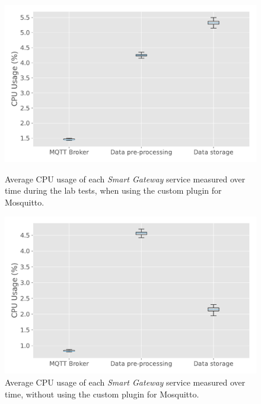 \begin{figure}[H]
    \begin{minipage}{0.45\linewidth}
        \centering
        \includegraphics[width=\linewidth]{images/labtest_cpu_usage_with_plugin.pdf}
        \caption{Average \acs{CPU} usage of each \textit{Smart Gateway} service measured over time during the lab tests, when using the custom plugin for Mosquitto.}
        \label{fig:labtest-cpu-usage}
    \end{minipage}
    \hspace{0.05\linewidth}
    \begin{minipage}{0.45\linewidth}
        \centering
        \includegraphics[width=\linewidth]{images/labtest_cpu_usage_without_plugin.pdf}
        \caption{Average \acs{CPU} usage of each \textit{Smart Gateway} service measured over time, without using the custom plugin for Mosquitto.}
        \label{fig:labtest-cpu-usage-noplug}
    \end{minipage}
\end{figure}

